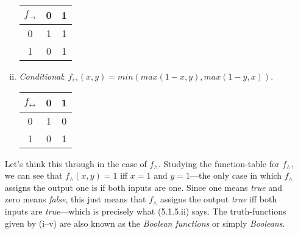 \begin{enumerate}[\thesection.1]
\begin{enumerate}[(i)]
			\begin{center}
			\begin{tabular}{c | c c}
			
			$f_\to$ & 0 & 1\\\hline
			
			0 & 1 & 1 \\

			1 & 0 & 1
		
			\end{tabular}
			\end{center}
			
			\item \emph{Conditional}: $f_\leftrightarrow(x,y)=min(max(1-x,y), max(1-y,x))$.
			
			\begin{center}
			\begin{tabular}{c | c c}
			
			$f_\leftrightarrow$ & 0 & 1\\\hline
		
			0 & 1 & 0 \\
		
			1 & 0 & 1
		
			\end{tabular}
			\end{center}
		
		\end{enumerate}
		Let's think this through in the case of $f_\land$. Studying the function-table for $f_\land$, we can see that $f_\land(x,y)=1$ iff $x=1$ and $y=1$---the only case in which $f_\land$ assigns the output one is if both inputs are one. Since one means \emph{true} and zero means \emph{false}, this just means that $f_\land$ assigns the output \emph{true} iff both inputs are \emph{true}---which is precisely what (5.1.5.ii) says. The truth-functions given by (i--v) are also known as the \emph{Boolean functions} or simply \emph{Booleans}.
		

\end{enumerate}
